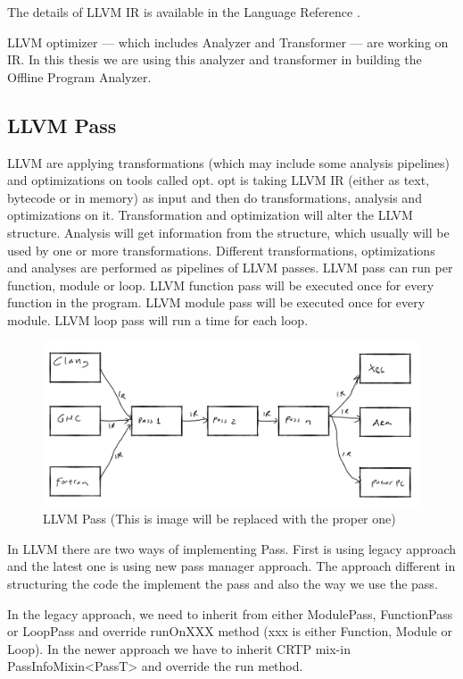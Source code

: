 The details of LLVM IR is available in the Language Reference \cite{LLVMLanguageReferencea}.

LLVM optimizer — which includes Analyzer and Transformer — are working on IR. In this thesis we are using this analyzer and transformer in building the Offline Program Analyzer.

\subsection{LLVM Pass}

LLVM are applying transformations (which may include some analysis pipelines) 
and optimizations on tools called opt.
opt is taking LLVM IR (either as text, bytecode or in memory) as input and then 
do transformations, analysis and optimizations on it. Transformation and 
optimization will alter the LLVM structure. Analysis will get information from 
the structure, which usually will be used by one or more transformations. 
Different transformations, optimizations and analyses are performed as 
pipelines of LLVM passes. LLVM pass can run per function, module or loop. LLVM 
function pass will be executed once for every function in the program. LLVM 
module pass will be executed once for every module. LLVM loop pass will run a 
time for each loop. 

\begin{figure}[htbp]
\centerline{\includegraphics[scale=.25]{Figures/llvm.png}}
\caption{LLVM Pass (This is image will be replaced with the proper one)}
\label{fig:2-2}
\end{figure}

In LLVM there are two ways of implementing Pass. First is using legacy approach and the latest one is using new pass manager approach. The approach different in structuring the code the implement the pass and also the way we use the pass. 

In the legacy approach, we need to inherit from either ModulePass, FunctionPass or LoopPass and override runOnXXX method (xxx is either Function, Module or Loop). In the newer approach we have to inherit CRTP mix-in PassInfoMixin<PassT> and override the run method.

